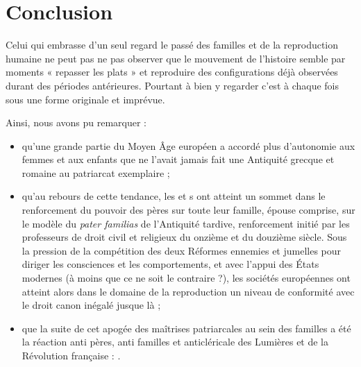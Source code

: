 


\chapter{Conclusion}


 Celui qui embrasse d'un seul regard le passé des familles et de la reproduction humaine ne peut pas ne pas observer que le mouvement de l'histoire semble par moments « repasser les plats » et reproduire des configurations déjà observées durant des périodes antérieures. Pourtant à bien y regarder c'est à chaque fois sous une forme originale et imprévue.  
 
 Ainsi, nous avons pu remarquer : 
\begin{itemize}

\item qu'une grande partie du Moyen Âge européen a accordé plus d'autonomie aux femmes et aux enfants que ne l'avait jamais fait une Antiquité grecque et romaine au patriarcat exemplaire ;

\item qu'au rebours de cette tendance, les  et s ont atteint un sommet dans le renforcement du pouvoir des pères sur toute leur famille, épouse comprise, sur le modèle du \emph{pater familias} de l'Antiquité tardive, renforcement initié par les professeurs de droit civil et religieux du onzième et du douzième siècle. Sous la pression de la compétition des deux Réformes ennemies et jumelles pour diriger les consciences et les comportements, et avec l'appui des États modernes (à moins que ce ne soit le contraire ?), les sociétés européennes ont atteint alors dans le domaine de la reproduction un niveau de conformité avec le droit canon inégalé jusque là ;

\item que la suite de cet apogée des maîtrises patriarcales au sein des familles a été la réaction anti pères, anti familles et anticléricale des Lumières et de la Révolution française : .


\end{itemize}
